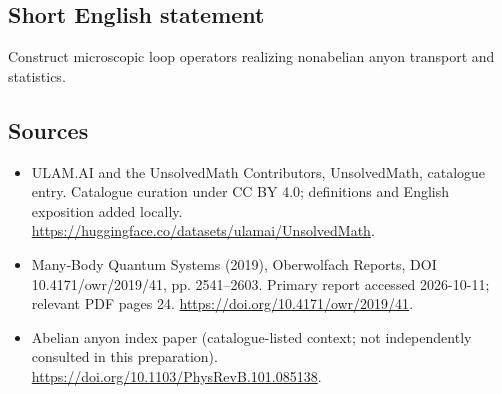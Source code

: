 \documentclass[11pt]{article}
\begin{document}
\subsection{Short English statement}
Construct microscopic loop operators realizing nonabelian anyon transport and statistics.
\subsection{Sources}
\begin{itemize}
\item[\hypertarget{source:statement:1}{S1}] ULAM.AI and the UnsolvedMath Contributors, UnsolvedMath, catalogue entry. Catalogue curation under CC BY 4.0; definitions and English exposition added locally.
\url{https://huggingface.co/datasets/ulamai/UnsolvedMath}.
\item[\hypertarget{source:statement:2}{S2}] Many-Body Quantum Systems (2019), Oberwolfach Reports, DOI 10.4171/owr/2019/41, pp. 2541--2603. Primary report accessed 2026-10-11; relevant PDF pages 24.
\url{https://doi.org/10.4171/owr/2019/41}.
\item[\hypertarget{source:statement:3}{S3}] Abelian anyon index paper (catalogue-listed context; not independently consulted in this preparation).
\url{https://doi.org/10.1103/PhysRevB.101.085138}.
\end{itemize}
\label{end:statement}
\end{document}
